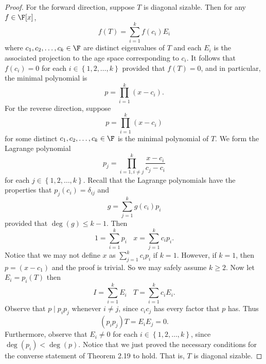 \documentclass[math_245.tex]{subfiles}
\begin{document}
    \begin{proof}
        For the forward direction, suppose $T$ is diagonal sizable. Then for any $f\in \F[x]$,
        \begin{equation*}
            f(T) = \sum^{k}_{i=1} f(c_i)E_i
        \end{equation*}
        where $c_1, c_2, \ldots, c_k\in \F$ are distinct eigenvalues of $T$ and each $E_i$ is the associated projection to the age space corresponding to $c_i$. It follows that $f(c_i) = 0$ for each $i\in \left\lbrace 1, 2, \ldots, k \right\rbrace$ provided that $f(T) = 0$, and in particular, the minimal polynomial is
        \begin{equation*}
            p = \prod^{k}_{i=1} (x-c_i).
        \end{equation*}
        For the reverse direction, suppose
        \begin{equation*}
            p = \prod^{k}_{i=1} (x-c_i)
        \end{equation*}
        for some distinct $c_1, c_2, \ldots, c_k\in \F$ is the minimal polynomial of $T$. We form the Lagrange polynomial
        \begin{equation*}
            p_j = \prod^{k}_{i=1,i\neq j} \frac{x-c_i}{c_j-c_i}
        \end{equation*}
        for each $j\in \left\lbrace 1, 2, \ldots, k \right\rbrace$. Recall that the Lagrange polynomials have the properties that $p_j(c_i) = \delta_{ij}$ and
        \begin{equation*}
            g = \sum^{k}_{j=1} g(c_i)p_i
        \end{equation*}
        provided that $\deg(g)\leq k-1$. Then
        \begin{equation*}
            1 = \sum^{k}_{i=1} p_i \ \ \ \ x = \sum^{k}_{j=1} c_ip_i.
        \end{equation*}
        Notice that we may not define $x$ as $\sum^{k}_{j=1} c_ip_i$ if $k = 1$. However, if $k=1$, then $p = (x-c_1)$ and the proof is trivial. So we may safely assume $k\geq 2$. Now let $E_i = p_i(T)$ then
        \begin{equation*}
            I = \sum^{k}_{i=1} E_i \ \ \ \ T = \sum^{k}_{i=1} c_iE_i.
        \end{equation*}
        Observe that $p\mid p_ip_j$ whenever $i\neq j$, since $c_ic_j$ has every factor that $p$ has. Thus
        \begin{equation*}
            \left( p_ip_j \right)T = E_iE_j = 0.
        \end{equation*}
        Furthermore, observe that $E_i\neq 0$ for each $i\in \left\lbrace 1, 2, \ldots, k \right\rbrace$, since $\deg(p_i) < \deg(p)$. Notice that we just proved the necessary conditions for the converse statement of Theorem 2.19 to hold. That is, $T$ is diagonal sizable.
    \end{proof}
\end{document}
